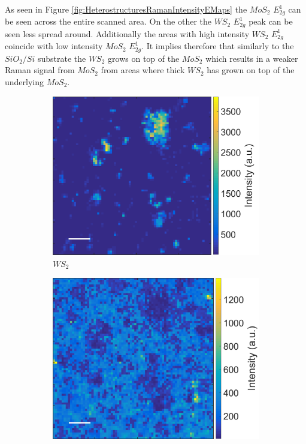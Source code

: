 As seen in Figure \ref{fig:HeterostructuresRamanIntensityEMaps} the $MoS_2$ $E^1_{2g}$ can be seen across the entire scanned area. On the other the $WS_2$ $E^1_{2g}$ peak can be seen less spread around. Additionally the areas with high intensity $WS_2$ $E^1_{2g}$ coincide with low intensity $MoS_2$ $E^1_{2g}$. It implies therefore that similarly to the $SiO_2/Si$ substrate the $WS_2$ grows on top of the $MoS_2$ which results in a weaker Raman signal from $MoS_2$ from areas where thick $WS_2$ has grown on top of the underlying $MoS_2$. 

\begin{figure}[H]
	\begin{center}
		\begin{subfigure}[b]{0.5\textwidth}
			\includegraphics[scale=0.25]{Heterostructures/HeterostructuresRamanIntensityEWAu.png}
			\caption{$WS_2$}
			\label{fig:HeterostructuresRamanIntensityEWAu}
		\end{subfigure}
		\begin{subfigure}[b]{0.45\textwidth}
			\includegraphics[scale=0.25]{Heterostructures/HeterostructuresRamanIntensityEMoAu.png}

\end{subfigure}
\end{center}
\end{figure}
